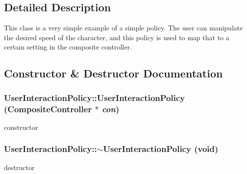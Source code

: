 \subsection{Detailed Description}
This class is a very simple example of a simple policy. The user can manipulate the desired speed of the character, and this policy is used to map that to a certain setting in the composite controller. 

\subsection{Constructor \& Destructor Documentation}
\hypertarget{classCartWheel_1_1Core_1_1UserInteractionPolicy_a9f88ed6295a2c14d281f29bf9cbb5c03}{
\subsubsection[{UserInteractionPolicy}]{\setlength{\rightskip}{0pt plus 5cm}UserInteractionPolicy::UserInteractionPolicy ({\bf CompositeController} $\ast$ {\em con})}}
\label{classCartWheel_1_1Core_1_1UserInteractionPolicy_a9f88ed6295a2c14d281f29bf9cbb5c03}
constructor \hypertarget{classCartWheel_1_1Core_1_1UserInteractionPolicy_a22983661797b83597ea790951037524f}{
\subsubsection[{$\sim$UserInteractionPolicy}]{\setlength{\rightskip}{0pt plus 5cm}UserInteractionPolicy::$\sim$UserInteractionPolicy (void)}}
\label{classCartWheel_1_1Core_1_1UserInteractionPolicy_a22983661797b83597ea790951037524f}
destructor 

